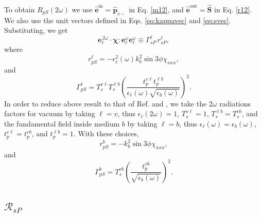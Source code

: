 \documentclass[10pt]{book}
\begin{document}
To obtain $R_{pS}(2\omega)$ we use
$\hat{\mathbf{e}}^{\mathrm{in}}=\hat{\mathbf{p}}_{v-}$ in Eq. \eqref{m12}, and
$\hat{\mathbf{e}}^{\mathrm{out}}=\hat{\mathbf{S}}$ in Eq. \eqref{r12}. We also
use the unit vectors defined in Eqs. \eqref{eq:kappavec} and
\eqref{eq:svec}. Substituting, we get
\begin{equation*}
\mathbf{e}^{\,2\omega}_{\ell}\cdot
\boldsymbol{\chi}:\mathbf{e}^\omega_{\ell}\mathbf{e}^\omega_{\ell}
\equiv\Gamma^{\ell}_{sP}\, r^{\ell}_{sP},
\end{equation*}
where
\begin{equation}
r^{\ell}_{pS}
= -\epsilon^{2}_{\ell}(\omega)k^{2}_{b}\sin3\phi\chi_{xxx},
\end{equation} 
and  
\begin{equation}
\Gamma^{\ell}_{pS} =
T^{v\ell}_{s}T^{\ell b}_{s}\left(\frac{t^{v\ell}_{p}t^{\ell b}_{p}}
      {\epsilon_{\ell}(\omega)\sqrt{\epsilon_{b}(\omega)}}\right)^{2}.
\end{equation} 
In order to reduce above result to that of Ref. \cite{mizrahiJOSA88} and
\cite{sipePRB87},  we take the $2\omega$ radiations factors for vacuum by
taking $\ell=v$, thus $\epsilon_{\ell}(2\omega)=1$, $T^{v\ell}_{s}=1$,
$T^{\ell b}_{s}=T^{vb}_{s}$, and the fundamental field inside medium $b$ by
taking $\ell=b$, thus $\epsilon_{\ell}(\omega)=\epsilon_{b}(\omega)$,
$t^{v\ell}_{p}=t^{vb}_{p}$, and $t^{\ell b}_{p}=1$. With these choices,
\begin{equation*}
r^{b}_{pS} = -k^{2}_{b}\sin3\phi\chi_{xxx},
\end{equation*} 
and 
\begin{equation*}
\Gamma^{b}_{pS} =
T^{vb}_{s}
\left(
\frac{t^{vb}_{p}}{\sqrt{\epsilon_{b}(\omega)}}
\right)^{2}.  
\end{equation*} 


\subsection{\texorpdfstring{$\mathcal{R}_{sP}$}{RsP}}
\end{document}

